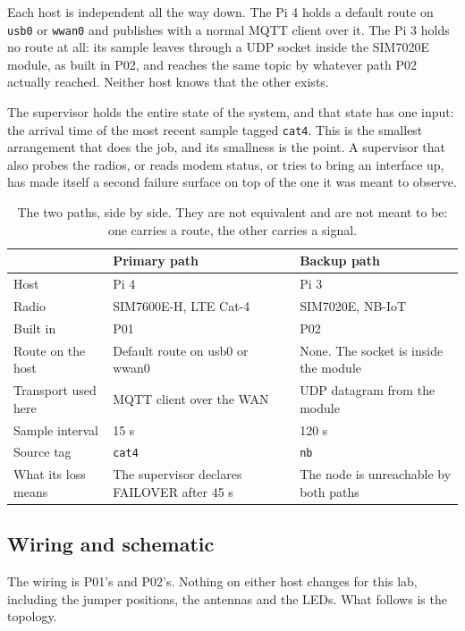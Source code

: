Each host is independent all the way down. The Pi 4 holds a default route on \texttt{usb0} or \texttt{wwan0} and publishes with a normal MQTT client over it. The Pi 3 holds no route at all: its sample leaves through a UDP socket inside the SIM7020E module, as built in P02, and reaches the same topic by whatever path P02 actually reached. Neither host knows that the other exists.

The supervisor holds the entire state of the system, and that state has one input: the arrival time of the most recent sample tagged \texttt{cat4}. This is the smallest arrangement that does the job, and its smallness is the point. A supervisor that also probes the radios, or reads modem status, or tries to bring an interface up, has made itself a second failure surface on top of the one it was meant to observe.

\begin{table}[H]\centering\small
\begin{tabular}{p{38mm}p{52mm}p{52mm}}
\toprule
 & Primary path & Backup path \\
\midrule
Host & Pi 4 & Pi 3 \\
Radio & SIM7600E-H, LTE Cat-4 & SIM7020E, NB-IoT \\
Built in & P01 & P02 \\
Route on the host & Default route on usb0 or wwan0 & None. The socket is inside the module \\
Transport used here & MQTT client over the WAN & UDP datagram from the module \\
Sample interval & 15 s & 120 s \\
Source tag & \texttt{cat4} & \texttt{nb} \\
What its loss means & The supervisor declares FAILOVER after 45 s & The node is unreachable by both paths \\
\bottomrule
\end{tabular}
\caption{The two paths, side by side. They are not equivalent and are not meant to be: one carries a route, the other carries a signal.}
\end{table}

\subsection*{Wiring and schematic}

The wiring is P01's and P02's. Nothing on either host changes for this lab, including the jumper positions, the antennas and the LEDs. What follows is the topology.

